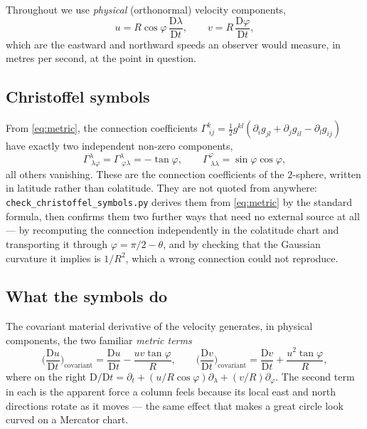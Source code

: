 \documentclass[11pt,a4paper]{article}
\newcommand{\file}[1]{\texttt{\nolinkurl{#1}}}
\newcommand{\D}{\mathrm{D}}
\begin{document}
Throughout we use \emph{physical} (orthonormal) velocity components,
%
\begin{equation}
u = R\cos\varphi\,\frac{\D\lambda}{\D t}, \qquad
v = R\,\frac{\D\varphi}{\D t} ,
\label{eq:physcomp}
\end{equation}
%
which are the eastward and northward speeds an observer would measure, in
metres per second, at the point in question.

\subsection{Christoffel symbols}

From \eqref{eq:metric}, the connection coefficients
$\Gamma^k_{\;ij} = \tfrac12 g^{kl}(\partial_i g_{jl} + \partial_j g_{il} -
\partial_l g_{ij})$ have exactly two independent non-zero components,
%
\begin{equation}
\Gamma^{\lambda}_{\;\lambda\varphi} = \Gamma^{\lambda}_{\;\varphi\lambda}
   = -\tan\varphi ,
\qquad
\Gamma^{\varphi}_{\;\lambda\lambda} = \sin\varphi\cos\varphi ,
\label{eq:christoffel}
\end{equation}
%
all others vanishing. These are the connection coefficients of the $2$-sphere,
written in latitude rather than colatitude. They are not quoted from anywhere:
\file{check_christoffel_symbols.py} derives them from \eqref{eq:metric} by the
standard formula, then confirms them two further ways that need no external
source at all --- by recomputing the connection independently in the colatitude
chart and transporting it through $\varphi = \pi/2 - \theta$, and by checking
that the Gaussian curvature it implies is $1/R^2$, which a wrong connection
could not reproduce.

\subsection{What the symbols do}

The covariant material derivative of the velocity generates, in physical
components, the two familiar \emph{metric terms}
%
\begin{equation}
\Big(\frac{\D u}{\D t}\Big)_{\!\text{covariant}}
 = \frac{\D u}{\D t} - \frac{u v \tan\varphi}{R},
\qquad
\Big(\frac{\D v}{\D t}\Big)_{\!\text{covariant}}
 = \frac{\D v}{\D t} + \frac{u^2 \tan\varphi}{R} ,
\label{eq:metricterms}
\end{equation}
%
where on the right $\D/\D t = \partial_t + (u/R\cos\varphi)\partial_\lambda +
(v/R)\partial_\varphi$. The second term in each is the apparent force a column
feels because its local east and north directions rotate as it moves --- the
same effect that makes a great circle look curved on a Mercator chart.
\end{document}
